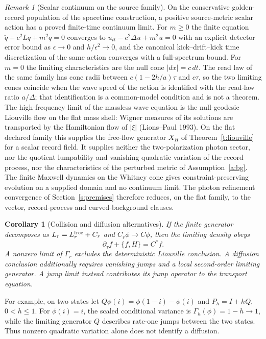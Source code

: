 \documentclass[11pt]{article}
\newtheorem{corollary}[theorem]{Corollary}
\theoremstyle{remark}
\newtheorem{remark}[theorem]{Remark}
\begin{document}
\begin{remark}[Scalar continuum on the source family]\label{r:scalar-continuum}
On the conservative golden-record population of the spacetime construction,
a positive source-metric scalar action has a proved finite-time continuum
limit. For $m\ge0$ the finite equation $\ddot q+c^2Lq+m^2q=0$ converges to
$u_{tt}-c^2\Delta u+m^2u=0$ with an explicit detector error bound as
$\epsilon\to0$ and $h/\epsilon^2\to0$, and the canonical kick--drift--kick
time discretization of the same action converges with a full-spectrum bound.
For $m=0$ the limiting characteristics are the null cone $|dx|=c\,dt$. The
read law of the same family has cone radii between $c(1-2h/a)\tau$ and
$c\tau$, so the two limiting cones coincide when the wave speed of the action
is identified with the read-law ratio $a/\Delta$; that identification is a
common-model condition and is not a theorem. The high-frequency limit of the
massless wave equation is the null-geodesic Liouville flow on the flat mass
shell: Wigner measures of its solutions are transported by the Hamiltonian
flow of $|\xi|$ (Lions--Paul 1993). On the flat declared family this supplies
the free-flow generator $X_H$ of Theorem~\ref{t:liouville} for a scalar record
field. It supplies neither the two-polarization photon sector, nor the
quotient lumpability and vanishing quadratic variation of the record
process, nor the characteristics of the perturbed metric of
Assumption~\ref{a:bg}. The finite Maxwell dynamics on the Whitney cone gives
constraint-preserving evolution on a supplied domain and no continuum limit.
The photon refinement convergence of Section~\ref{s:premises} therefore
reduces, on the flat family, to the vector, record-process and
curved-background clauses.
\end{remark}

\begin{corollary}[Collision and diffusion alternatives]
If the finite generator decomposes as $L_r=L_r^{\rm free}+C_r$ and
$C_r\phi\to C\phi$, then the limiting density obeys
\[
\partial_\tau f+\{f,H\}=C^*f.
\]
A nonzero limit of $\Gamma_r$ excludes the deterministic Liouville
conclusion. A diffusion conclusion additionally requires vanishing jumps and
a local second-order limiting generator. A jump limit instead contributes
its jump operator to the transport equation.
\end{corollary}

For example, on two states let $Q\phi(i)=\phi(1-i)-\phi(i)$ and
$P_h=I+hQ$, $0<h\leq1$. For $\phi(i)=i$, the scaled conditional
variance is $\Gamma_h(\phi)=1-h\to1$, while the limiting generator
$Q$ describes rate-one jumps between the two states. Thus nonzero
quadratic variation alone does not identify a diffusion.
\end{document}
